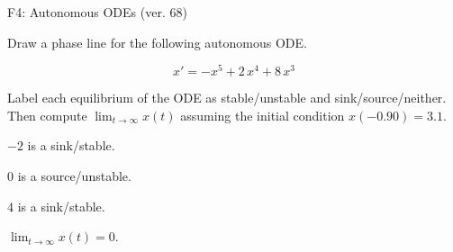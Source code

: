 \begin{exercise}
  \begin{exerciseTitle}F4: Autonomous ODEs (ver. 68)\end{exerciseTitle}
  \begin{exerciseStatement}
    

      Draw a phase line for the following 
      autonomous ODE.
    

    
\[x'= -x^{5} + 2 \, x^{4} + 8 \, x^{3}\]

    

      Label each equilibrium of the ODE
      as stable/unstable and sink/source/neither.
      Then compute \(\lim_{t\to\infty}x(t)\)
      assuming the initial condition
      \(x( -0.90 )= 3.1\).
    

  \end{exerciseStatement}
  \begin{exerciseAnswer}
    

      \(-2\) is a sink/stable.
      
        \(0\) is a source/unstable.
      
      \(4\) is a sink/stable.
    

    

      \(\lim_{t\to\infty}x(t)=0\).
    

  \end{exerciseAnswer}
\end{exercise}